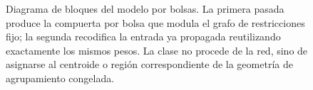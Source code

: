 \documentclass[11pt,a4paper]{article}
\begin{document}
\begin{figure}[H]
\caption{Diagrama de bloques del modelo por bolsas. La primera pasada produce la compuerta por
bolsa que modula el grafo de restricciones fijo; la segunda recodifica la entrada ya propagada
reutilizando exactamente los mismos pesos. La clase no procede de la red, sino de asignarse al
centroide o
región correspondiente de la geometría de agrupamiento congelada.}
\label{fig:modelo}
\end{figure}
\end{document}
